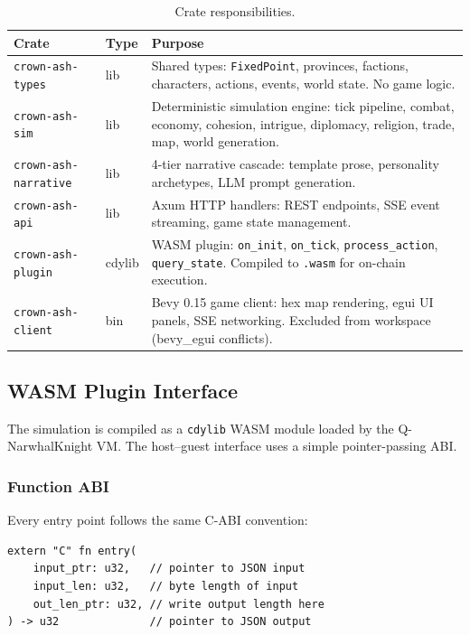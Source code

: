 \documentclass[a4paper, 11pt]{article}
\newcommand{\fp}{\texttt{FixedPoint}}
\newcommand{\crateref}[1]{\texttt{crown-ash-#1}}
\begin{document}
\begin{table}[htbp]
\centering
\caption{Crate responsibilities.}
\label{tab:crates}
\begin{tabular}{@{}llp{7cm}@{}}
\toprule
\textbf{Crate} & \textbf{Type} & \textbf{Purpose} \\
\midrule
\crateref{types}     & lib   & Shared types: \fp{}, provinces, factions, characters, actions, events, world state. No game logic. \\
\crateref{sim}       & lib   & Deterministic simulation engine: tick pipeline, combat, economy, cohesion, intrigue, diplomacy, religion, trade, map, world generation. \\
\crateref{narrative} & lib   & 4-tier narrative cascade: template prose, personality archetypes, LLM prompt generation. \\
\crateref{api}       & lib   & Axum HTTP handlers: REST endpoints, SSE event streaming, game state management. \\
\crateref{plugin}    & cdylib & WASM plugin: \texttt{on\_init}, \texttt{on\_tick}, \texttt{process\_action}, \texttt{query\_state}. Compiled to \texttt{.wasm} for on-chain execution. \\
\crateref{client}    & bin   & Bevy 0.15 game client: hex map rendering, egui UI panels, SSE networking. Excluded from workspace (bevy\_egui conflicts). \\
\bottomrule
\end{tabular}
\end{table}

\subsection{WASM Plugin Interface}
\label{sec:wasm}

The simulation is compiled as a \texttt{cdylib} WASM module loaded by the
Q-NarwhalKnight VM. The host--guest interface uses a simple pointer-passing ABI.

\subsubsection{Function ABI}

Every entry point follows the same C-ABI convention:

\begin{lstlisting}[caption={WASM entry point signature.}]
extern "C" fn entry(
    input_ptr: u32,   // pointer to JSON input
    input_len: u32,   // byte length of input
    out_len_ptr: u32, // write output length here
) -> u32              // pointer to JSON output
\end{lstlisting}
\end{document}

